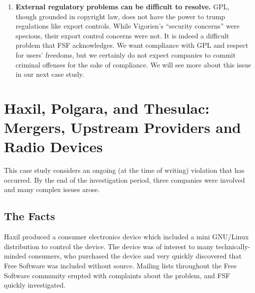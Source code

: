 {\begin{enumerate}
  The ``security concerns'' argument is often floated as a reason to keep
  software proprietary, but the computer security community has on
  numerous occasions confirmed that such arguments are entirely specious.
  Security experts have found --- since the beginnings of the field of
  cryptography in the ancient world --- that sharing results about systems
  and having such systems withstand peer review and scrutiny builds the
  most secure systems. While full disclosure may help some who wish to
  compromise security, it helps those who want to fix problems even more
  by identifying them early.

\item {\bf External regulatory problems can be difficult to resolve.}
  GPL, though grounded in copyright law, does not have the power to trump
  regulations like export controls. While Vigorien's ``security
  concerns'' were specious, their export control concerns were not. It is
  indeed a difficult problem that FSF acknowledges. We want compliance
  with GPL and respect for users' freedoms, but we certainly do not expect
  companies to commit criminal offenses for the sake of compliance. We
  will see more about this issue in our next case study.
\end{enumerate}


\chapter{Haxil, Polgara, and Thesulac: Mergers, Upstream Providers and Radio Devices}

This case study considers an ongoing (at the time of writing) violation
that has occurred. By the end of the investigation period, three
companies were involved and many complex issues arose.

\section{The Facts}

Haxil produced a consumer electronics device which included a mini
GNU/Linux distribution to control the device. The device was of interest
to many technically-minded consumers, who purchased the device and very
quickly discovered that Free Software was included without source.
Mailing lists throughout the Free Software community erupted with
complaints about the problem, and FSF quickly investigated.

}
